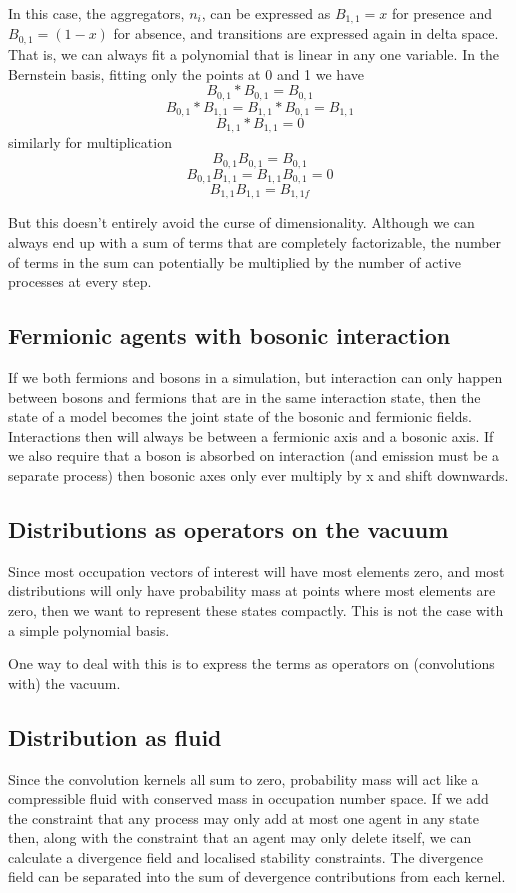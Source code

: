 \documentclass[a4paper]{article}
\begin{document}
In this case, the aggregators, $n_i$, can be expressed as $B_{1,1}=x$ for presence and $B_{0,1}=(1-x)$ for absence, and transitions are expressed again in delta space. That is, we can always fit a polynomial that is linear in any one variable. In the Bernstein basis, fitting only the points at 0 and 1 we have 
\[
B_{0,1} \ast B_{0,1} = B_{0,1}
\]
\[B_{0,1} \ast B_{1,1} = B_{1,1} \ast B_{0,1} = B_{1,1}\]
\[
B_{1,1} \ast B_{1,1} = 0
\]
similarly for multiplication
\[
B_{0,1}B_{0,1} = B_{0,1}
\]
\[
B_{0,1}B_{1,1} = B_{1,1}B_{0,1} = 0
\]
\[
B_{1,1}B_{1,1} = B_{1,1f}
\]

But this doesn't entirely avoid the curse of dimensionality. Although we can always end up with a sum of terms that are completely factorizable, the number of terms in the sum can potentially be multiplied by the number of active processes at every step.

\subsection{Fermionic agents with bosonic interaction}

If we both fermions and bosons in a simulation, but interaction can only happen between bosons and fermions that are in the same interaction state, then the state of a model becomes the joint state of the bosonic and fermionic fields. Interactions then will always be between a fermionic axis and a bosonic axis. If we also require that a boson is absorbed on interaction (and emission must be a separate process) then bosonic axes only ever multiply by x and shift downwards.

\subsection{Distributions as operators on the vacuum}
Since most occupation vectors of interest will have most elements zero, and most distributions will only have probability mass at points where most elements are zero, then we want to represent these states compactly. This is not the case with a simple polynomial basis.

One way to deal with this is to express the terms as operators on (convolutions with) the vacuum.

\subsection{Distribution as fluid}
Since the convolution kernels all sum to zero, probability mass will act like a compressible fluid with conserved mass in occupation number space. If we add the constraint that any process may only add at most one agent in any state then, along with the constraint that an agent may only delete itself, we can calculate a divergence field and localised stability constraints. The divergence field can be separated into the sum of devergence contributions from each kernel.
\end{document}
